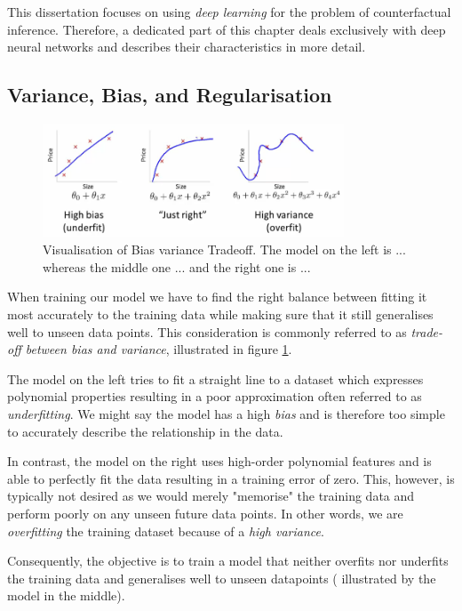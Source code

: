 This dissertation focuses on using \emph{deep learning} for the problem of counterfactual inference. Therefore, a dedicated part of this chapter deals exclusively with deep neural networks and describes their characteristics in more detail. 


\subsection{Variance, Bias, and Regularisation} \label{sec:regularisation}
\begin{figure}[]
	\centering
	\includegraphics[width=0.8\textwidth]{figures/chapter-2/overfitting-underfitting.png}
	\caption{Visualisation of Bias variance Tradeoff. The model on the left is ... whereas the middle one ... and the right one is ...}	\label{fig:overfitting-underfitting}
\end{figure}
When training our model we have to find the right balance between fitting it most accurately to the training data while making sure that it still generalises well to unseen data points. This consideration is commonly referred to as \emph{trade-off between bias and variance},  illustrated in figure \ref{fig:overfitting-underfitting}. 

The model on the left tries to fit a straight line to a dataset which expresses polynomial properties resulting in a poor approximation often referred to as \emph{underfitting}. We might say the model has a high \emph{bias} and is therefore too simple to accurately describe the relationship in the data. 

In contrast, the model on the right uses high-order polynomial features and is able to perfectly fit the data resulting in a training error of zero. This, however, is typically not desired as we would merely "memorise" the training data and perform poorly on any unseen future data points. In other words, we are \emph{overfitting} the training dataset because of a \emph{high variance}.  

Consequently, the objective is to train a model that neither overfits nor underfits the training data and generalises well to unseen datapoints ( illustrated by the model in the middle). 

